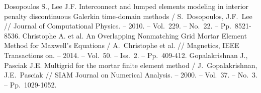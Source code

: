 \documentclass[a4paper,12pt]{article}
\begin{document}
\begin{thebibliography}{10}
Dosopoulos S., Lee J.F. Interconnect and lumped elements modeling in interior penalty discontinuous Galerkin time-domain methods / S.~Dosopoulos, J.F.~Lee // Journal of Computational Physics. -- 2010. -- Vol.~229. -- No.~22. -- Pp.~8521-8536.
Christophe A. et al. An Overlapping Nonmatching Grid Mortar Element Method for Maxwell's Equations / A.~Christophe et al. // Magnetics, IEEE Transactions on. -- 2014. -- Vol.~50. -- Iss.~2. -- Pp.~409-412.
Gopalakrishnan J., Pasciak J.E. Multigrid for the mortar finite element method / J.~Gopalakrishnan, J.E.~Pasciak // SIAM Journal on Numerical Analysis. -- 2000. -- Vol.~37. -- No.~3. -- Pp.~1029-1052.
\end{thebibliography}


\clearpage
{}
\end{document}
